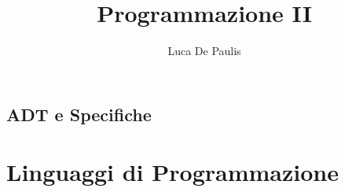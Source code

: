 \documentclass[
    oneside,
    10pt,
    language=italian,
    pagestyle=notes,
    fontstyle=palaeuler,
    thmstyle=margin-name
]{modernth}
\begin{document}
\author{Luca De Paulis}
\title{Programmazione II}
\maketitle

\tableofcontents





\chapter{ADT e Specifiche}


\part{Linguaggi di Programmazione}











\end{document}
